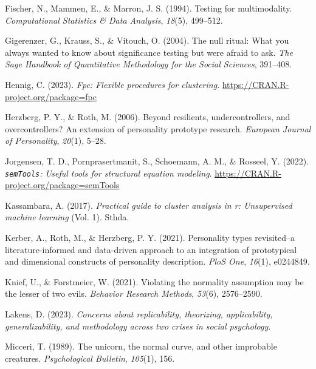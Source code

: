 \documentclass[
  man,floatsintext]{apa7}
\newlength{\cslhangindent}
\newlength{\cslentryspacingunit} %
\newenvironment{CSLReferences}[2] %
 {%
  \setlength{\parindent}{0pt}
  \ifodd #1
  \let\oldpar\par
  \def\par{\hangindent=\cslhangindent\oldpar}
  \fi
  \setlength{\parskip}{#2\cslentryspacingunit}
 }%
 {}
\begin{document}
\begin{CSLReferences}{1}{0}
\leavevmode{}%
Fischer, N., Mammen, E., \& Marron, J. S. (1994). Testing for multimodality. \emph{Computational Statistics \& Data Analysis}, \emph{18}(5), 499--512.

\leavevmode{}%
Gigerenzer, G., Krauss, S., \& Vitouch, O. (2004). The null ritual: What you always wanted to know about significance testing but were afraid to ask. \emph{The Sage Handbook of Quantitative Methodology for the Social Sciences}, 391--408.

\leavevmode{}%
Hennig, C. (2023). \emph{Fpc: Flexible procedures for clustering}. \url{https://CRAN.R-project.org/package=fpc}

\leavevmode{}%
Herzberg, P. Y., \& Roth, M. (2006). Beyond resilients, undercontrollers, and overcontrollers? An extension of personality prototype research. \emph{European Journal of Personality}, \emph{20}(1), 5--28.

\leavevmode{}%
Jorgensen, T. D., Pornprasertmanit, S., Schoemann, A. M., \& Rosseel, Y. (2022). \emph{\texttt{semTools}: {U}seful tools for structural equation modeling}. \url{https://CRAN.R-project.org/package=semTools}

\leavevmode{}%
Kassambara, A. (2017). \emph{Practical guide to cluster analysis in r: Unsupervised machine learning} (Vol. 1). Sthda.

\leavevmode{}%
Kerber, A., Roth, M., \& Herzberg, P. Y. (2021). Personality types revisited--a literature-informed and data-driven approach to an integration of prototypical and dimensional constructs of personality description. \emph{PloS One}, \emph{16}(1), e0244849.

\leavevmode{}%
Knief, U., \& Forstmeier, W. (2021). Violating the normality assumption may be the lesser of two evils. \emph{Behavior Research Methods}, \emph{53}(6), 2576--2590.

\leavevmode{}%
Lakens, D. (2023). \emph{Concerns about replicability, theorizing, applicability, generalizability, and methodology across two crises in social psychology}.

\leavevmode{}%
Micceri, T. (1989). The unicorn, the normal curve, and other improbable creatures. \emph{Psychological Bulletin}, \emph{105}(1), 156.


\end{CSLReferences}
\end{document}
